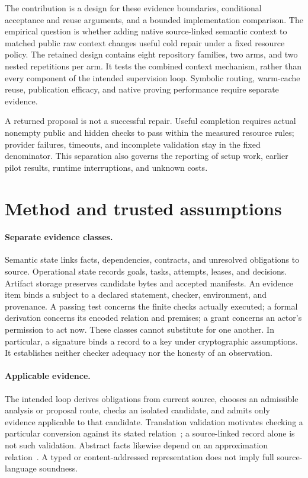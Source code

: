 \documentclass{article}
\begin{document}
The contribution is a design for these evidence boundaries, conditional
acceptance and reuse arguments, and a bounded implementation comparison.
The empirical question is whether adding native source-linked semantic
context to matched public raw context changes useful cold repair under a
fixed resource policy. The retained design contains eight repository families,
two arms, and two nested repetitions per arm. It tests the combined context
mechanism, rather than every component of the intended supervision loop.
Symbolic routing, warm-cache reuse, publication efficacy, and native proving
performance require separate evidence.

A returned proposal is not a successful repair. Useful completion requires
actual nonempty public and hidden checks to pass within the measured resource
rules; provider failures, timeouts, and incomplete validation stay in the fixed
denominator. This separation also governs the reporting of setup work, earlier
pilot results, runtime interruptions, and unknown costs.

\section{Method and trusted assumptions}
\label{sec:evidence-method}

\paragraph{Separate evidence classes.}
Semantic state links facts, dependencies, contracts, and unresolved obligations
to source. Operational state records goals, tasks, attempts, leases, and
decisions. Artifact storage preserves candidate bytes and accepted manifests.
An evidence item binds a subject to a declared statement, checker, environment,
and provenance. A passing test concerns the finite checks actually executed;
a formal derivation concerns its encoded relation and premises; a grant concerns
an actor's permission to act now. These classes cannot substitute for one another.
In particular, a signature binds a record to a key under cryptographic
assumptions. It establishes neither checker adequacy nor the honesty of an
observation.

\paragraph{Applicable evidence.}
The intended loop derives obligations from current source, chooses an
admissible analysis or proposal route, checks an isolated candidate, and admits
only evidence applicable to that candidate. Translation validation motivates
checking a particular conversion against its stated relation~\citep{baseline04};
a source-linked record alone is not such validation. Abstract facts likewise
depend on an approximation relation~\citep{baseline02}. A typed or
content-addressed representation does not imply full source-language soundness.
\end{document}

